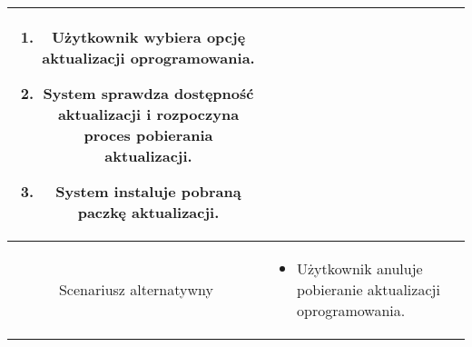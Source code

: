 \documentclass{article}
\begin{document}
\begin{enumerate}
\begin{enumerate}
\begin{table}[H]
\begin{tabular}{|c|p{7cm}|}
\begin{enumerate}
\item Użytkownik wybiera opcję aktualizacji oprogramowania.

\item System sprawdza dostępność aktualizacji i rozpoczyna proces pobierania aktualizacji.

\item System instaluje pobraną paczkę aktualizacji.\end{enumerate} \\
						\hline
						Scenariusz alternatywny & \begin{itemize}\item Użytkownik anuluje pobieranie aktualizacji oprogramowania.\end{itemize}                                                                                                                                                                                    \\
						\hline
					\end{tabular}
				\end{table}


\end{enumerate}
\end{enumerate}
\end{document}
